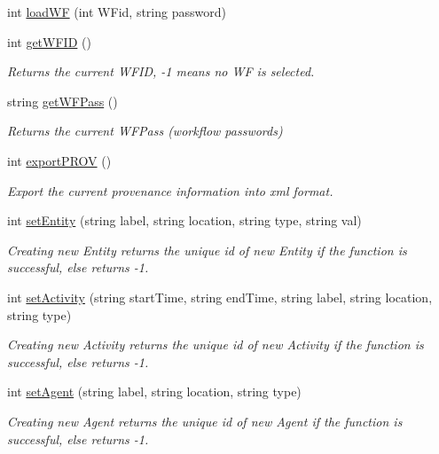 \begin{DoxyCompactItemize}
int \hyperlink{class_in_di_prov_client_ae2e0dd71c6b83274706f1bb26742cabe}{load\-W\-F} (int W\-Fid, string password)
\item 
int \hyperlink{class_in_di_prov_client_ab4cd3159aff7a597b2a394a43b589003}{get\-W\-F\-I\-D} ()
\begin{DoxyCompactList}\small\item\em Returns the current W\-F\-I\-D, -\/1 means no W\-F is selected. \end{DoxyCompactList}\item 
string \hyperlink{class_in_di_prov_client_aa45bb40b1c500fbd4a7a9abd862e7f82}{get\-W\-F\-Pass} ()
\begin{DoxyCompactList}\small\item\em Returns the current W\-F\-Pass (workflow passwords) \end{DoxyCompactList}\item 
int \hyperlink{class_in_di_prov_client_a18211425d8d357513a16ff8314727470}{export\-P\-R\-O\-V} ()
\begin{DoxyCompactList}\small\item\em Export the current provenance information into xml format. \end{DoxyCompactList}\item 
int \hyperlink{class_in_di_prov_client_abc388b71a141493921a6e51f18b60da8}{set\-Entity} (string label, string location, string type, string val)
\begin{DoxyCompactList}\small\item\em Creating new Entity returns the unique id of new Entity if the function is successful, else returns -\/1. \end{DoxyCompactList}\item 
int \hyperlink{class_in_di_prov_client_a8a2e2aaf3f8b6a8e31f31af31603b681}{set\-Activity} (string start\-Time, string end\-Time, string label, string location, string type)
\begin{DoxyCompactList}\small\item\em Creating new Activity returns the unique id of new Activity if the function is successful, else returns -\/1. \end{DoxyCompactList}\item 
int \hyperlink{class_in_di_prov_client_a75ad36497b77b81841cf8cf411aea244}{set\-Agent} (string label, string location, string type)
\begin{DoxyCompactList}\small\item\em Creating new Agent returns the unique id of new Agent if the function is successful, else returns -\/1. \end{DoxyCompactList}\item 

\end{DoxyCompactItemize}
